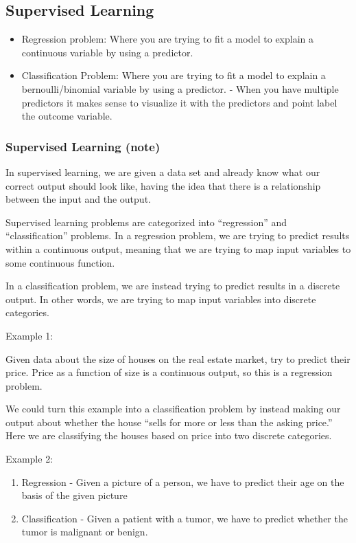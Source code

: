 \documentclass[
]{article}
\begin{document}
\hypertarget{supervised-learning}{%
\subsection{Supervised Learning}\label{supervised-learning}}

\begin{itemize}
\item
  Regression problem: Where you are trying to fit a model to explain a
  continuous variable by using a predictor.
\item
  Classification Problem: Where you are trying to fit a model to explain
  a bernoulli/binomial variable by using a predictor. - When you have
  multiple predictors it makes sense to visualize it with the predictors
  and point label the outcome variable.
\end{itemize}

\hypertarget{supervised-learning-note}{%
\subsubsection{Supervised Learning
(note)}\label{supervised-learning-note}}

In supervised learning, we are given a data set and already know what
our correct output should look like, having the idea that there is a
relationship between the input and the output.

Supervised learning problems are categorized into ``regression'' and
``classification'' problems. In a regression problem, we are trying to
predict results within a continuous output, meaning that we are trying
to map input variables to some continuous function.

In a classification problem, we are instead trying to predict results in
a discrete output. In other words, we are trying to map input variables
into discrete categories.

Example 1:

Given data about the size of houses on the real estate market, try to
predict their price. Price as a function of size is a continuous output,
so this is a regression problem.

We could turn this example into a classification problem by instead
making our output about whether the house ``sells for more or less than
the asking price.'' Here we are classifying the houses based on price
into two discrete categories.

Example 2:

\begin{enumerate}
\def\labelenumi{(\alph{enumi})}
\item
  Regression - Given a picture of a person, we have to predict their age
  on the basis of the given picture
\item
  Classification - Given a patient with a tumor, we have to predict
  whether the tumor is malignant or benign.
\end{enumerate}
\end{document}
